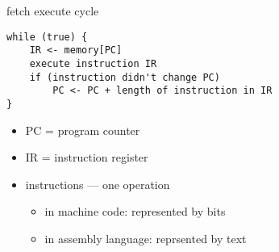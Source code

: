 \begin{frame}[fragile,label=fetchExecute]{fetch execute cycle}
\lstset{language=C++}
\begin{Verbatim}
while (true) {
    IR <- memory[PC]
    execute instruction IR
    if (instruction didn't change PC)
        PC <- PC + length of instruction in IR
}
\end{Verbatim}
    \begin{itemize}
    \item PC = program counter
    \item IR = instruction register
    \item instructions --- one operation
        \begin{itemize}
        \item in machine code: represented by bits
        \item in assembly language: reprsented by text
        \end{itemize}
    \end{itemize}
\end{frame}
